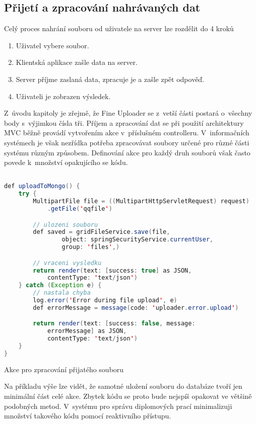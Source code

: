 \subsection{Přijetí a zpracování nahrávaných dat}
Celý proces nahrání souboru od uživatele na server lze rozdělit do 4 kroků
\begin{enumerate}
\item Uživatel vybere soubor.
\item Klientská aplikace zašle data na server.
\item Server příjme zaslaná data, zpracuje je a zašle zpět odpověď.
\item Uživateli je zobrazen výsledek.
\end{enumerate}

Z~úvodu kapitoly je zřejmě, že Fine Uploader se z~vetší části postará o~všechny body s~výjimkou čísla tři. Příjem a zpracování dat se při použití architektury MVC běžně provádí vytvořením akce v~příslušném controlleru. V~informačních systémech je však nezřídka potřeba zpracovávat soubory určené pro různé části systému různým způsobem. Definování akce  pro každý druh souborů však často povede k~množství opakujícího se kódu.

\begin{example}
    \centering
    \begin{lstlisting}[language=Java]

def uploadToMongo() {
    try {
        MultipartFile file = ((MultipartHttpServletRequest) request)
            .getFile('qqfile')

        // ulozeni souboru
        def saved = gridFileService.save(file,
                object: springSecurityService.currentUser,
                group: 'files',)

        // vraceni vysledku
        return render(text: [success: true] as JSON,
            contentType: 'text/json')
    } catch (Exception e) {
        // nastala chyba
        log.error('Error during file upload', e)
        def errorMessage = message(code: 'uploader.error.upload')

        return render(text: [success: false, message:
            errorMessage] as JSON,
            contentType: 'text/json')
    }
}
    \end{lstlisting}
    \caption{Akce pro zpracování přijatého souboru}
\end{example}

Na příkladu výše lze vidět, že samotné uložení souboru do databáze tvoří jen minimální část celé akce. Zbytek kódu se proto bude nejspíš opakovat ve většině podobných metod. V~systému pro správu diplomových prací minimalizuji množství takového kódu pomocí reaktivního přístupu.

